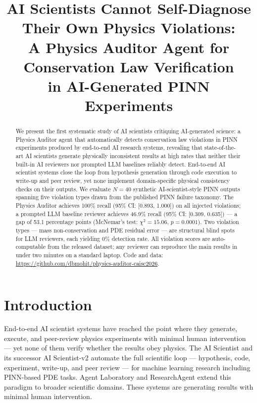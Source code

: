 \documentclass{article}
\title{AI Scientists Cannot Self-Diagnose Their Own Physics Violations:\\
A Physics Auditor Agent for Conservation Law Verification\\
in AI-Generated PINN Experiments}
\author{}
\begin{document}
\maketitle

\begin{abstract}
We present the first systematic study of AI scientists critiquing
AI-generated science: a Physics Auditor agent that automatically detects
conservation law violations in PINN experiments produced by end-to-end AI
research systems, revealing that state-of-the-art AI scientists generate
physically inconsistent results at high rates that neither their built-in AI
reviewers nor prompted LLM baselines reliably detect.
End-to-end AI scientist systems close the loop from hypothesis generation
through code execution to write-up and peer review, yet none implement
domain-specific physical consistency checks on their outputs.
We evaluate $N=40$ synthetic AI-scientist-style PINN outputs spanning five
violation types drawn from the published PINN failure taxonomy.
The Physics Auditor achieves 100\% recall (95\% CI: [0.893, 1.000]) on all
injected violations; a prompted LLM baseline reviewer achieves 46.9\% recall
(95\% CI: [0.309, 0.635]) --- a gap of 53.1 percentage points
(McNemar's test: $\chi^2 = 15.06$, $p = 0.0001$).
Two violation types --- mass non-conservation and PDE residual error ---
are structural blind spots for LLM reviewers, each yielding 0\% detection rate.
All violation scores are auto-computable from the released dataset;
any reviewer can reproduce the main results in under two minutes on a
standard laptop. Code and data:
\url{https://github.com/dbmohit/physics-auditor-caisc2026}.
\end{abstract}

\section{Introduction}

End-to-end AI scientist systems have reached the point where they generate,
execute, and peer-review physics experiments with minimal human intervention
--- yet none of them verify whether the results obey physics.
The AI Scientist \citep{Lu2024AIScientist} and its successor AI Scientist-v2
\citep{Lu2025AIScientistV2} automate the full scientific loop ---
hypothesis, code, experiment, write-up, and peer review --- for machine
learning research including PINN-based PDE tasks.
Agent Laboratory \citep{Wang2024AgentLab} and ResearchAgent
\citep{Baek2024ResearchAgent} extend this paradigm to broader scientific domains.
These systems are generating results with minimal human intervention.
\end{document}
